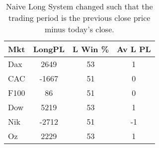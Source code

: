\begin{table}[ht]
\centering
\caption[Naive Long System - Close to Close]{Naive Long System changed such that the trading period is the previous close price minus today's close.} 
\label{tab:nlng_results_2}
\begin{tabular}{lccc}
  \toprule Mkt & LongPL & L Win \% & Av L PL \\ 
  \midrule Dax & 2649 & 53 & 1 \\ 
  CAC & -1667 & 51 & 0 \\ 
  F100 & 86 & 51 & 0 \\ 
  Dow & 5219 & 53 & 1 \\ 
  Nik & -2712 & 51 & -1 \\ 
  Oz & 2229 & 53 & 1 \\ 
   \bottomrule \end{tabular}
\end{table}
